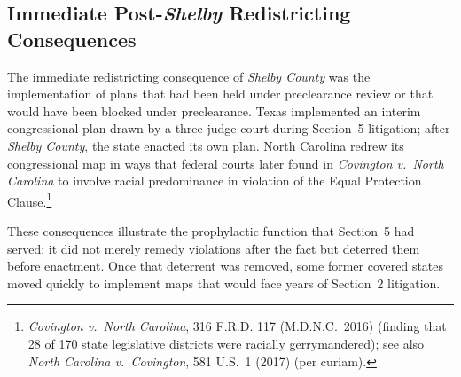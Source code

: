 \subsection{Immediate Post-\textit{Shelby} Redistricting Consequences}

The immediate redistricting consequence of \textit{Shelby County} was
the implementation of plans that had been held under preclearance review
or that would have been blocked under preclearance. Texas implemented
an interim congressional plan drawn by a three-judge court during
Section~5 litigation; after \textit{Shelby County}, the state enacted
its own plan. North Carolina redrew its congressional map in ways that
federal courts later found in \textit{Covington v.\ North Carolina}
to involve racial predominance in violation of the Equal Protection
Clause.\footnote{\textit{Covington v.\ North Carolina}, 316 F.R.D. 117
(M.D.N.C.\ 2016) (finding that 28 of 170 state legislative districts were
racially gerrymandered); see also \textit{North Carolina v.\ Covington},
581 U.S.\ 1 (2017) (per curiam).}

These consequences illustrate the prophylactic function that Section~5
had served: it did not merely remedy violations after the fact but
deterred them before enactment. Once that deterrent was removed, some
former covered states moved quickly to implement maps that would face
years of Section~2 litigation.
